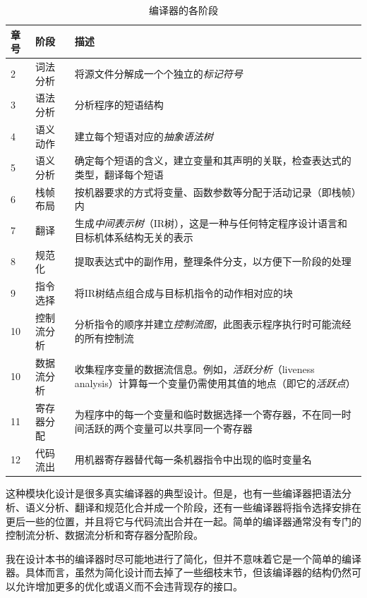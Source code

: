 \documentclass[cn,11pt,chinese]{elegantbook}
\begin{document}
\begin{table}[htbp]
  \centering
  \caption{编译器的各阶段}
    \begin{tabular}{p{1cm}|p{2cm}|p{10cm}}
    \toprule
    \textbf{章号} & \textbf{阶段} & \textbf{描述} \\
    \midrule
    2 & 词法分析 & 将源文件分解成一个个独立的\textit{标记符号} \\
    \midrule
    3 & 语法分析 & 分析程序的短语结构 \\
    \midrule
    4 & 语义动作 & 建立每个短语对应的\textit{抽象语法树} \\
    \midrule
    5 & 语义分析 & 确定每个短语的含义，建立变量和其声明的关联，检查表达式的类型，翻译每个短语 \\
    \midrule
    6 & 栈帧布局 & 按机器要求的方式将变量、函数参数等分配于活动记录（即栈帧）内 \\
    \midrule
    7 & 翻译 & 生成\textit{中间表示树}（IR树），这是一种与任何特定程序设计语言和目标机体系结构无关的表示 \\
    \midrule
    8 & 规范化 & 提取表达式中的副作用，整理条件分支，以方便下一阶段的处理 \\
    \midrule
    9 & 指令选择 & 将IR树结点组合成与目标机指令的动作相对应的块 \\
    \midrule
    10 & 控制流分析 & 分析指令的顺序并建立\textit{控制流图}，此图表示程序执行时可能流经的所有控制流 \\
    \midrule
    10 & 数据流分析 & 收集程序变量的数据流信息。例如，\textit{活跃分析}（liveness analysis）计算每一个变量仍需使用其值的地点（即它的\textit{活跃点}） \\
    \midrule
    11 & 寄存器分配 & 为程序中的每一个变量和临时数据选择一个寄存器，不在同一时间活跃的两个变量可以共享同一个寄存器 \\
    \midrule
    12 & 代码流出 & 用机器寄存器替代每一条机器指令中出现的临时变量名 \\
    \bottomrule
    \end{tabular}
  \label{tab:compiler-phases}
\end{table}

这种模块化设计是很多真实编译器的典型设计。但是，也有一些编译器把语法分析、语义分析、翻译和规范化合并成一个阶段，还有一些编译器将指令选择安排在更后一些的位置，并且将它与代码流出合并在一起。简单的编译器通常没有专门的控制流分析、数据流分析和寄存器分配阶段。

我在设计本书的编译器时尽可能地进行了简化，但并不意味着它是一个简单的编译器。具体而言，虽然为简化设计而去掉了一些细枝末节，但该编译器的结构仍然可以允许增加更多的优化或语义而不会违背现存的接口。
\end{document}
